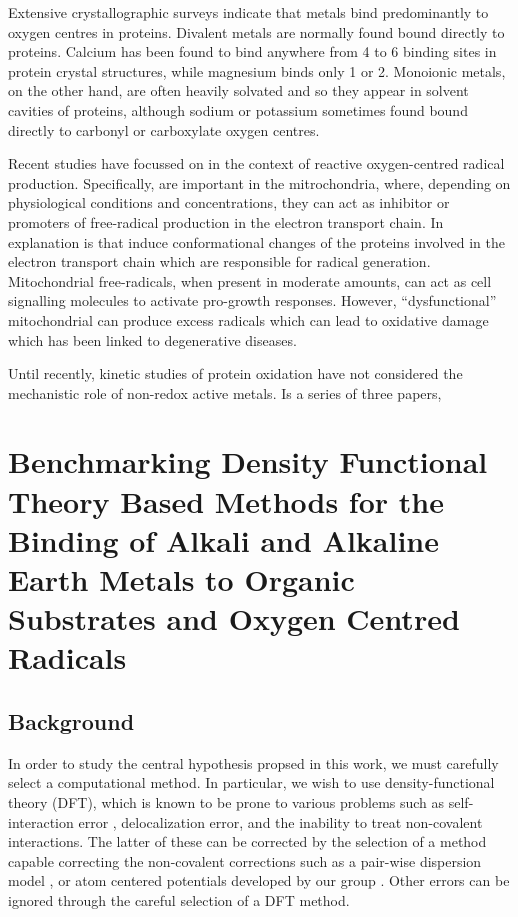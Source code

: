 Extensive crystallographic surveys indicate that metals bind predominantly to oxygen centres in proteins.\cite{Harding1999, Harding2001, Hsin2006} Divalent metals are normally found bound directly to proteins. Calcium has been found to bind anywhere from 4 to 6 binding sites in protein crystal structures, while magnesium binds only 1 or 2. Monoionic metals, on the other hand, are often heavily solvated and so they appear in solvent cavities of proteins, although sodium or potassium sometimes found bound directly to carbonyl or carboxylate oxygen centres.\cite{Harding2010}

Recent studies have focussed on  in the context of reactive oxygen-centred radical production.\cite{Goerlach2015} Specifically,  are important in the mitrochondria, where, depending on physiological conditions and concentrations, they can act as inhibitor or promoters of free-radical production in the electron transport chain.\cite{AdamVizi2010} In explanation is that  induce conformational changes of the proteins involved in the electron transport chain which are responsible for radical generation.\cite{Brookes2004} Mitochondrial free-radicals, when present in moderate amounts, can act as cell signalling molecules to activate pro-growth responses.\cite{Sullivan2014} However, ``dysfunctional'' mitochondrial can produce excess radicals which can lead to oxidative damage which has been linked to degenerative diseases.

Until recently, kinetic studies of protein oxidation have not considered the mechanistic role of non-redox active metals. Is a series of three papers, 

\section{Benchmarking Density Functional Theory Based Methods for the Binding of Alkali and Alkaline Earth Metals to Organic Substrates and Oxygen Centred Radicals}

\subsection{Background}

In order to study the central hypothesis propsed in this work, we must carefully select a computational method. In particular, we wish to use density-functional theory (DFT), which is known to be prone to various problems such as self-interaction error \cite{Dutoi2006}, delocalization error,\cite{OterodelaRoza2014} and the inability to treat non-covalent interactions.\cite{Johnson2009,DiLabio2016} The latter of these can be corrected by the selection of a method capable correcting the non-covalent corrections such as a pair-wise dispersion model , or atom centered potentials developed by our group . Other errors can be ignored through the careful selection of a DFT method.

